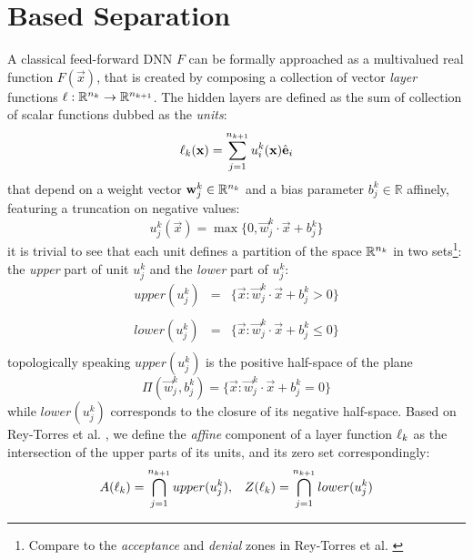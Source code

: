 \section{\ReLU Based Separation}\label{sec:separability}

A classical feed-forward DNN $F$ can be formally approached as a multivalued real function $F(\vec{x})$, that is created by composing a collection of vector \emph{layer} functions $\ell:\mathbb{R}^{n_k}\rightarrow\mathbb{R}^{n_{k+1}}$. The hidden layers are defined as the sum of collection of scalar functions dubbed as the \emph{units}: 
\begin{equation}\label{eq:layer}
\ell_k(\mathbf{x}) = \sum^{n_{k+1}}_{j=1} u_i^k(\mathbf{x}) \hat{\textbf{e}}_i
\end{equation}
that depend on a weight vector $\mathbf{w}_j^k\in\mathbb{R}^{n_k}$ and a bias parameter $b_j^k\in\mathbb{R}$ affinely, featuring a truncation on negative values:
\begin{equation}\label{eq:unit}
u_j^k(\vec{x}) = \max\{0,\vec{w}_j^k \cdot \vec{x} + b_j^k\}
\end{equation}
it is trivial to see that each unit defines a partition of the space $\mathbb{R}^{n_k}$ in two sets\footnote{Compare to the \emph{acceptance} and \emph{denial} zones in Rey-Torres et al. \cite{reyRiera2019ModellingClassificationReLU}}: the \emph{upper} part of unit $u_j^k$ and the \emph{lower} part of $u_j^k$:
\begin{equation}\label{eq:upperAndLowerSets}
\begin{array}{lcl}
    upper(u_j^k) &=& \{\vec{x}:\vec{w}_j^k \cdot \vec{x} + b_j^k > 0\}\\\\
    lower(u_j^k) &=& \{\vec{x}:\vec{w}_j^k \cdot \vec{x} + b_j^k\leq 0\}\\
\end{array}
\end{equation}
topologically speaking $upper(u_j^k)$ is the positive half-space of the plane 
\begin{equation}\label{eq:separatingPlane}
    \Pi(\vec{w}_j^k,b_j^k) = 
    \{ 
     \vec{x}:\vec{w}_j^k\cdot\vec{x}+b_j^k =0
    \}
\end{equation}
while $lower(u_j^k)$ corresponds to the closure of its negative half-space. Based on Rey-Torres et al. \cite{reyRiera2019ModellingClassificationReLU}, we define the \emph{affine} component of a layer function $\ell_k$ as the intersection of the upper parts of its units, and its zero set correspondingly:
\begin{equation}\label{eq:affineCompAndZeroSet}
\begin{array}{cc}
    A(\ell_k) = \displaystyle\bigcap_{j=1}^{n_{k+1}}upper(u_j^k), &
    Z(\ell_k) = \displaystyle\bigcap_{j=1}^{n_{k+1}}lower(u_j^k)\\
    \end{array}
\end{equation}
